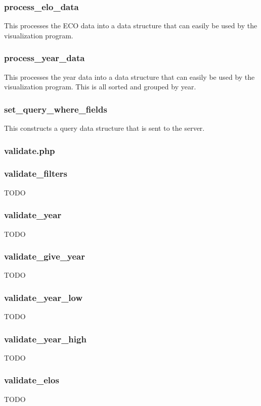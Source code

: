 \documentclass{article}
\begin{document}
\subsubsection*{process\_elo\_data}
This processes the ECO data into a data structure that can easily be used by the visualization program.

\subsubsection*{process\_year\_data}
This processes the year data into a data structure that can easily be used by the visualization program. This is all sorted and grouped by year.

\subsubsection*{set\_query\_where\_fields}
This constructs a query data structure that is sent to the server.


\subsubsection{validate.php}


\subsubsection*{validate\_filters}
TODO

\subsubsection*{validate\_year}
TODO

\subsubsection*{validate\_give\_year}
TODO

\subsubsection*{validate\_year\_low}
TODO

\subsubsection*{validate\_year\_high}
TODO

\subsubsection*{validate\_elos}
TODO
\end{document}
